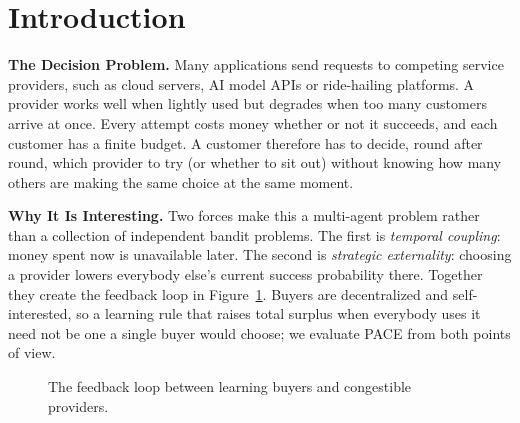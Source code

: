 \documentclass{article}
\begin{document}
\section{Introduction}
\textbf{The Decision Problem.} Many applications send requests to competing service providers, such as cloud servers, AI model APIs or ride-hailing platforms. A provider works well when lightly used but degrades when too many customers arrive at once. Every attempt costs money whether or not it succeeds, and each customer has a finite budget. A customer therefore has to decide, round after round, which provider to try (or whether to sit out) without knowing how many others are making the same choice at the same moment.

\textbf{Why It Is Interesting.} Two forces make this a multi-agent problem rather than a collection of independent bandit problems. The first is \emph{temporal coupling}: money spent now is unavailable later. The second is \emph{strategic externality}: choosing a provider lowers everybody else's current success probability there. Together they create the feedback loop in Figure~\ref{fig:loop}. Buyers are decentralized and self-interested, so a learning rule that raises total surplus when everybody uses it need not be one a single buyer would choose; we evaluate PACE from both points of view.

\begin{figure}[h]
\centering
{}
\caption{The feedback loop between learning buyers and congestible providers.}
\label{fig:loop}
\end{figure}
\end{document}
